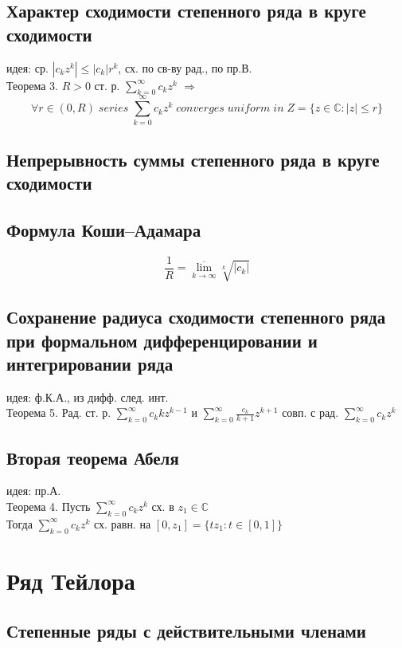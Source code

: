 \documentclass{article}
\begin{document}
\subsection{Характер сходимости степенного ряда в круге сходимости}
идея: ср. $|c_k z^k| \leq |c_k| r^k$, сх. по св-ву рад., по пр.В.\\
Теорема 3. $R>0$ ст. р. $\sum_{k=0}^\infty c_k z^k$ $\Rightarrow$
\begin{equation*}
    \forall r \in (0, R) \; series \; \sum_{k=0}^\infty c_k z^k \; converges \; uniform \; in \; Z = \{ z \in \mathbb C: |z| \leq r \}
\end{equation*}
\subsection{Непрерывность суммы степенного ряда в круге сходимости}
\subsection{Формула Коши–Адамара}
\begin{equation*}
    \frac{1}{R} = \underset{k \rightarrow \infty}{\overline{\lim}} \sqrt[k]{|c_k|}
\end{equation*}
\subsection{Сохранение радиуса сходимости степенного ряда при формальном дифференцировании и интегрировании ряда}
идея: ф.К.А., из дифф. след. инт. \\
Теорема 5. Рад. ст. р. $\sum_{k=0}^\infty c_k k z^{k-1}$ и $\sum_{k=0}^\infty \frac{c_k}{k+1} z^{k+1}$ совп. с рад. $\sum_{k=0}^\infty c_k z^k$
\subsection{Вторая теорема Абеля}
идея: пр.А. \\
Теорема 4. Пусть $\sum_{k=0}^\infty c_k z^k$ сх. в $z_1 \in \mathbb C$ \\
Тогда $\sum_{k=0}^\infty c_k z^k$ сх. равн. на $[0, z_1] = \{ tz_1: t \in [0,1] \}$


\newpage
\section{Ряд Тейлора}
\subsection{Степенные ряды с действительными членами}
\end{document}
